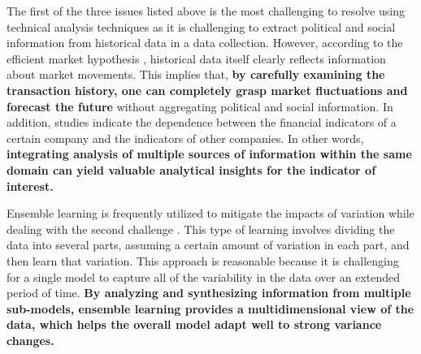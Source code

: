 The first of the three issues listed above is the most challenging to resolve using technical analysis techniques as it is challenging to extract political and social information from historical data in a data collection. However, according to the efficient market hypothesis \cite{fama1970efficient}, historical data itself clearly reflects information about market movements. This implies that, \textbf{by carefully examining the transaction history, one can completely grasp market fluctuations and forecast the future} without aggregating political and social information. In addition, studies \cite{overreactioncontrarian, mech1993portfolio} indicate the dependence between the financial indicators of a certain company and the indicators of other companies. In other words, \textbf{integrating analysis of multiple sources of information within the same domain can yield valuable analytical insights for the indicator of interest.}


Ensemble learning is frequently utilized to mitigate the impacts of variation while dealing with the second challenge \cite{ali2020complete, zafeiriou2020intraday, sadeghi2021combined}. This type of learning involves dividing the data into several parts, assuming a certain amount of variation in each part, and then learn that variation. This approach is reasonable because it is challenging for a single model to capture all of the variability in the data over an extended period of time. \textbf{By analyzing and synthesizing information from multiple sub-models, ensemble learning provides a multidimensional view of the data, which helps the overall model adapt well to strong variance changes.}


